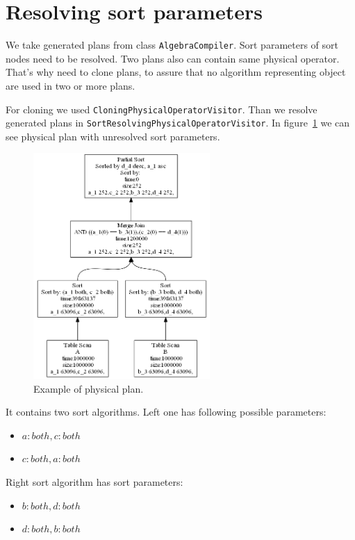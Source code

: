 \section{Resolving sort parameters}

We take generated plans from class \texttt{AlgebraCompiler}. Sort parameters of sort nodes need to be resolved. Two plans also can contain same physical operator. That's why need to clone plans, to assure that no algorithm representing object are used in two or more plans.

For cloning we used \texttt{CloningPhysicalOperatorVisitor}. Than we resolve generated plans in \texttt{SortResolvingPhysicalOperatorVisitor}. In figure~\ref{fig:plansortunresolved} we can see physical plan with unresolved sort parameters. 

\begin{figure}[h!]
  \centering
    \includegraphics[width=0.6\textwidth]{plansortunresolved}

      \caption{Example of physical plan.}
          \label{fig:plansortunresolved}
\end{figure}

It contains two sort algorithms. Left one has following possible parameters:

\begin{itemize}
\item $a:both, c:both$
\item $c:both, a:both$
\end{itemize}

Right sort algorithm has sort parameters:
\begin{itemize}
\item $b:both, d:both$
\item $d:both, b:both$
\end{itemize}

